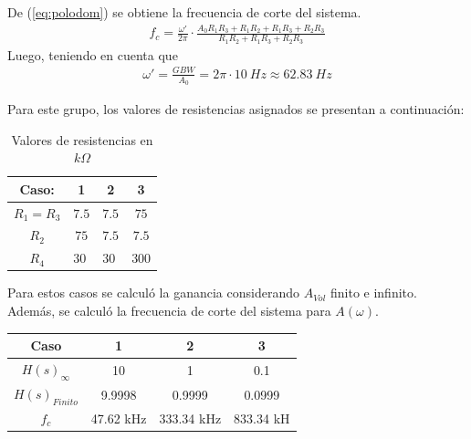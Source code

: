 De (\ref{eq:polodom}) se obtiene la frecuencia de corte del sistema.
\begin{align}
f_c=\frac{\omega'}{2\pi} \cdot \frac{A_0R_1R_3+R_1R_2+R_1R_3+R_2R_3}{R_1R_2+R_1R_3+R_2R_3}
\end{align}
Luego, teniendo en cuenta que
\begin{align}
\omega'=\frac{GBW}{A_0} = 2 \pi\cdot 10 \ Hz \approx 62.83 \ Hz
\end{align}

Para este grupo, los valores de resistencias asignados se presentan a continuación:
\begin{table}[H]
\begin{center}
\begin{tabular}{|c|c|c|c|}
\hline
\textbf{Caso:}              & \textbf{1}               & \textbf{2}               & \textbf{3}                \\ \hline
$R_1=R_3$                   & $7.5$                      & $7.5$                      & $75$                       \\ \hline
$R_2$                       & $75$                       & $7.5$                      & $7.5$                       \\ \hline
\multicolumn{1}{|c|}{$R_4$} & \multicolumn{1}{l|}{$30$} & \multicolumn{1}{l|}{$30$} & \multicolumn{1}{l|}{$300$} \\ \hline
\end{tabular}
\caption{Valores de resistencias en $k\Omega$}
\label{tabla:resasignadas}
\end{center}
\end{table}

Para estos casos se calculó la ganancia considerando $A_{Vol}$ finito e infinito. Además, se calculó la frecuencia de corte del sistema para $A(\omega)$.

\begin{table}[H]
\begin{center}
\begin{tabular}{|c|c|c|c|}
\hline
\textbf{Caso}            & \textbf{1} & \textbf{2} & \textbf{3} \\ \hline
\textbf{$H(s)_{\infty}$} & 10         & 1          & 0.1        \\ \hline
\textbf{$H(s)_{Finito}$} & 9.9998     & 0.9999     & 0.0999     \\ \hline
\textbf{$f_c$}           & 47.62 kHz   & 333.34 kHz  & 833.34 kH     \\ \hline
\end{tabular}
\end{center}
\end{table}

